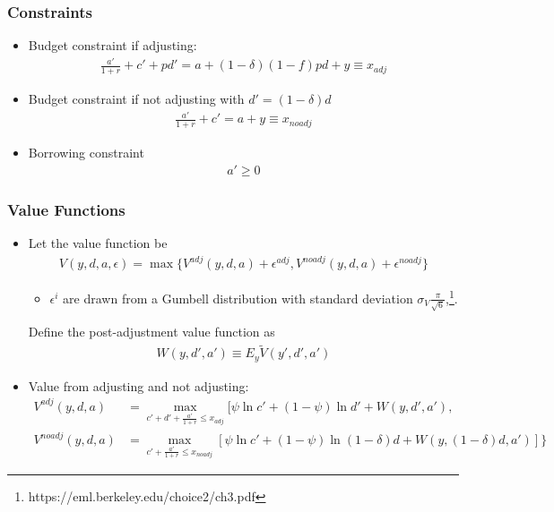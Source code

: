 \documentclass[english,xcolor=svgnames]{beamer}
\begin{document}
\begin{frame}
    \frametitle{Constraints}
    \begin{itemize}
        \item Budget constraint if adjusting:
        \begin{align*}
            \frac{a'}{1+r} +c'+ p d' = a + (1-\delta)(1-f)pd + y \equiv x_{adj}
        \end{align*}
        \item Budget constraint if not adjusting with $d'= (1-\delta)d$
        \begin{align*}
            \frac{a'}{1+r}+c' = a + y \equiv x_{noadj}
        \end{align*}
        \item Borrowing constraint
        \begin{align*}
            a'\ge 0
        \end{align*}
    \end{itemize}
\end{frame}


\begin{frame}
    \frametitle{Value Functions}
    \begin{itemize}
        \item Let the value function be
        \begin{align*}
            V(y,d,a,\epsilon) = \max\{V^{adj}(y,d,a) + \epsilon^{adj}, V^{noadj}(y,d,a) + \epsilon^{noadj} \}
        \end{align*}
        \begin{itemize}
            \item $\epsilon^i$ are drawn from a Gumbell distribution with standard deviation $\sigma_V\frac{\pi}{\sqrt{6}}$,\footnote{https://eml.berkeley.edu/choice2/ch3.pdf}.
        \end{itemize}
        Define the post-adjustment value function as
        \begin{align*}
            W(y,d',a') \equiv E_y \tilde{V}(y',d',a')
        \end{align*}
        \item Value from adjusting and not adjusting:
        \begin{align*}
            V^{adj}(y,d,a)&=\max_{c'+d'+\frac{a'}{1+r}\le x_{adj}}[\psi \ln c' +(1-\psi) \ln d' + W(y,d',a'), \\
            V^{noadj}(y,d,a)&=\max_{c'+\frac{a'}{1+r}\le x_{noadj}}[\psi \ln c' +(1-\psi) \ln (1-\delta)d + W(y,(1-\delta)d,a')]\}
        \end{align*}
    \end{itemize}
\end{frame}
\end{document}
